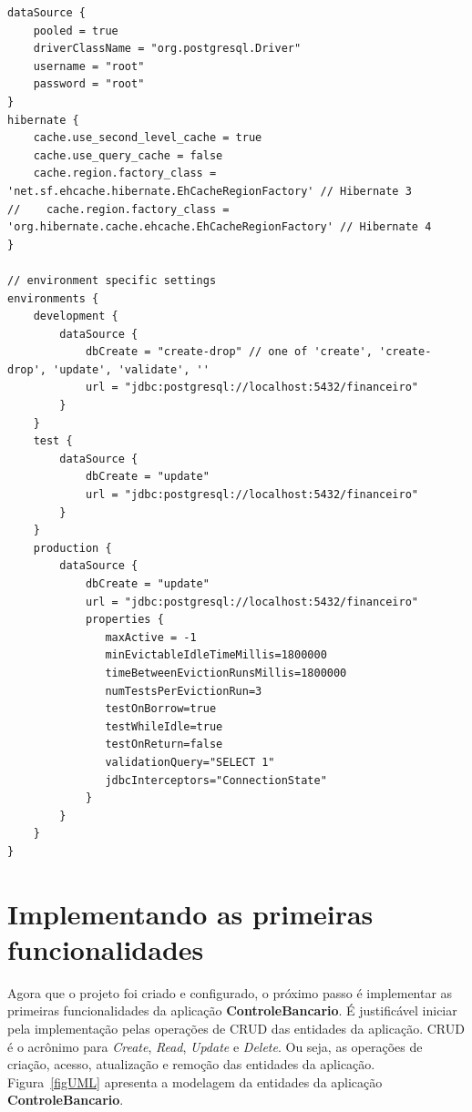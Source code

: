 \begin{lstlisting}[caption={\bf  DataSource.groovy}, frame  =  trBL, float=htbp,
    label=codDataSource] 
dataSource {
    pooled = true
    driverClassName = "org.postgresql.Driver"
    username = "root"
    password = "root"
}
hibernate {
    cache.use_second_level_cache = true
    cache.use_query_cache = false
    cache.region.factory_class = 'net.sf.ehcache.hibernate.EhCacheRegionFactory' // Hibernate 3
//    cache.region.factory_class = 'org.hibernate.cache.ehcache.EhCacheRegionFactory' // Hibernate 4
}

// environment specific settings
environments {
    development {
        dataSource {
            dbCreate = "create-drop" // one of 'create', 'create-drop', 'update', 'validate', ''
            url = "jdbc:postgresql://localhost:5432/financeiro"
        }
    }
    test {
        dataSource {
            dbCreate = "update"
            url = "jdbc:postgresql://localhost:5432/financeiro"
        }
    }
    production {
        dataSource {
            dbCreate = "update"
            url = "jdbc:postgresql://localhost:5432/financeiro"
            properties {
               maxActive = -1
               minEvictableIdleTimeMillis=1800000
               timeBetweenEvictionRunsMillis=1800000
               numTestsPerEvictionRun=3
               testOnBorrow=true
               testWhileIdle=true
               testOnReturn=false
               validationQuery="SELECT 1"
               jdbcInterceptors="ConnectionState"
            }
        }
    }
}
\end{lstlisting}

\newpage

\section{Implementando as primeiras funcionalidades}\label{CRUD}

\vspace{0.5cm}

Agora que o  projeto foi criado e configurado, o próximo  passo é implementar as
primeiras funcionalidades da aplicação {\bf ControleBancario}.  É justificável iniciar pela implementação  pelas operações de CRUD das entidades
da aplicação.  CRUD é o acrônimo para  {\it Create}, {\it Read},  {\it Update} e
{\it Delete}.  Ou  seja, as operações de criação,  acesso, atualização e remoção
das  entidades  da  aplicação.   Figura~\ref{figUML} apresenta  a  modelagem  da
entidades da aplicação {\bf ControleBancario}.

